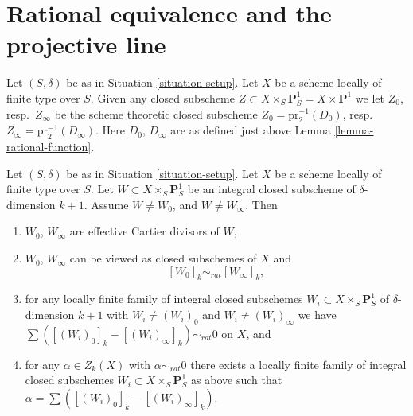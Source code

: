














\section{Rational equivalence and the projective line}
\label{section-different-rational-equivalence}

\noindent
Let $(S, \delta)$ be as in Situation \ref{situation-setup}.
Let $X$ be a scheme locally of finite type over $S$.
Given any closed subscheme
$Z \subset X \times_S \mathbf{P}^1_S = X \times \mathbf{P}^1$
we let $Z_0$, resp.\ $Z_\infty$ be the scheme theoretic closed
subscheme $Z_0 = \text{pr}_2^{-1}(D_0)$,
resp.\ $Z_\infty = \text{pr}_2^{-1}(D_\infty)$.
Here $D_0$, $D_\infty$ are as defined just above
Lemma \ref{lemma-rational-function}.

\begin{lemma}
\label{lemma-rational-equivalence-family}
Let $(S, \delta)$ be as in Situation \ref{situation-setup}.
Let $X$ be a scheme locally of finite type over $S$.
Let $W \subset X \times_S \mathbf{P}^1_S$ be an integral
closed subscheme of $\delta$-dimension $k + 1$.
Assume $W \not = W_0$, and $W \not = W_\infty$. Then
\begin{enumerate}
\item $W_0$, $W_\infty$ are effective Cartier divisors of $W$,
\item $W_0$, $W_\infty$ can be viewed as closed subschemes
of $X$ and
$$
[W_0]_k \sim_{rat} [W_\infty]_k,
$$
\item for any locally finite family of
integral closed subschemes
$W_i \subset X \times_S \mathbf{P}^1_S$
of $\delta$-dimension $k + 1$ with $W_i \not = (W_i)_0$ and
$W_i \not = (W_i)_\infty$ we have
$\sum ([(W_i)_0]_k - [(W_i)_\infty]_k) \sim_{rat} 0$
on $X$, and
\item for any $\alpha \in Z_k(X)$ with $\alpha \sim_{rat} 0$
there exists a locally finite family of
integral closed subschemes $W_i \subset X \times_S \mathbf{P}^1_S$
as above such that $\alpha = \sum ([(W_i)_0]_k - [(W_i)_\infty]_k)$.
\end{enumerate}
\end{lemma}

